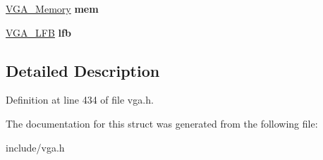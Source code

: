 \begin{DoxyCompactItemize}
\item 
\hypertarget{structVGA__Type_ade860ae7b9935ad2fd4613758b998c1b}{\hyperlink{structVGA__Memory}{V\-G\-A\-\_\-\-Memory} {\bfseries mem}}\label{structVGA__Type_ade860ae7b9935ad2fd4613758b998c1b}

\item 
\hypertarget{structVGA__Type_ab46a6c5770cc6e5a528e6456e998af78}{\hyperlink{structVGA__LFB}{V\-G\-A\-\_\-\-L\-F\-B} {\bfseries lfb}}\label{structVGA__Type_ab46a6c5770cc6e5a528e6456e998af78}

\end{DoxyCompactItemize}


\subsection{Detailed Description}


Definition at line 434 of file vga.\-h.



The documentation for this struct was generated from the following file\-:\begin{DoxyCompactItemize}
\item 
include/vga.\-h\end{DoxyCompactItemize}
